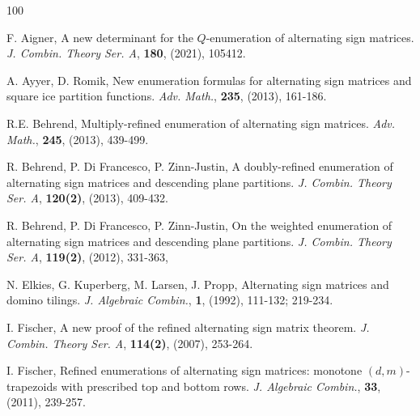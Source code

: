 \documentclass[12pt, a4paper]{amsart} %
\numberwithin{equation}{section}
\begin{document}
\begin{thebibliography}{100} %


F. Aigner, A new determinant for the $Q$-enumeration of alternating sign matrices. {\em J. Combin. Theory Ser. A}, {\bf 180}, (2021), 105412.

A. Ayyer, D. Romik, New enumeration formulas for alternating sign matrices and square ice partition functions. {\em Adv. Math.}, {\bf 235}, (2013), 161-186.


R.E. Behrend, Multiply-refined enumeration of alternating sign matrices. {\em Adv. Math.}, {\bf 245}, (2013), 439-499.

R. Behrend, P. Di Francesco, P. Zinn-Justin, A doubly-refined enumeration of alternating sign matrices and descending plane partitions. {\em J. Combin. Theory Ser. A}, {\bf 120(2)}, (2013),  409-432.

R. Behrend, P. Di Francesco, P. Zinn-Justin, On the weighted enumeration of alternating sign matrices and descending plane partitions. {\em J. Combin. Theory Ser. A}, {\bf 119(2)}, (2012), 331-363,



N. Elkies, G. Kuperberg, M. Larsen, J. Propp, Alternating sign matrices and domino tilings. {\em J. Algebraic Combin.}, {\bf 1}, (1992), 111-132; 219-234.


I. Fischer, A new proof of the refined alternating sign matrix theorem. {\em J. Combin. Theory Ser. A}, {\bf 114(2)}, (2007), 253-264. 


I. Fischer, Refined enumerations of alternating sign matrices: monotone $(d, m)$-trapezoids with prescribed top and bottom rows. {\em J. Algebraic Combin.}, {\bf 33}, (2011), 239-257.


\end{thebibliography}
\end{document}
